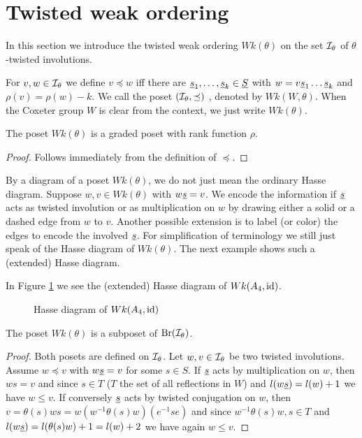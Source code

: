 \section{Twisted weak ordering}
\label{sec:twisted-involutions-twisted-weak-ordering}

In this section we introduce the twisted weak ordering $Wk(\theta)$ on the set $\mathcal{I}_{\theta}$ of $\theta$-twisted involutions.

\begin{defi}
	For $v,w \in \mathcal{I}_{\theta}$ we define $v \preceq w$ iff there are $\underline{s}_1, \ldots, \underline{s}_k \in \underline{S}$ with $w = v \underline{s}_1 \ldots \underline{s}_k$ and $\rho(v) = \rho(w) - k$. We call the poset $(\mathcal{I}_{\theta},\preceq)$ , denoted by $Wk(W, \theta)$. When the Coxeter group $W$ is clear from the context, we just write $Wk(\theta)$.
\end{defi}

\begin{lemm}
	The poset $Wk(\theta)$ is a graded poset with rank function $\rho$.

	\begin{proof}
		Follows immediately from the definition of $\preceq$.
	\end{proof}
\end{lemm}

By a diagram of a poset $Wk(\theta)$, we do not just mean the ordinary Hasse diagram. Suppose $w,v \in Wk(\theta)$ with $w \underline{s} = v$. We encode the information if $\underline{s}$ acts as twisted involution or as multiplication on $w$ by drawing either a solid or a dashed edge from $w$ to $v$. Another possible extension is to label (or color) the edges to encode the involved $\underline{s}$. For simplification of terminology we still just speak of the Hasse diagram of $Wk(\theta)$. The next example shows such a (extended) Hasse diagram.

\begin{exam}
	In Figure \ref{fig:a4} we see the (extended) Hasse diagram of $Wk(A_4, \operatorname{id})$.

	\begin{figure}[ht]
		\centering
		
		\caption{Hasse diagram of $Wk(A_4, \operatorname{id})$}
		\label{fig:a4}
	\end{figure}
\end{exam}

\begin{lemm}
	The poset $Wk(\theta)$ is a subposet of $\operatorname{Br}(\mathcal{I}_{\theta})$.

	\begin{proof}
		Both posets are defined on $\mathcal{I}_{\theta}$. Let $w,v \in \mathcal{I}_{\theta}$ be two twisted involutions. Assume $w \preceq v$ with $w \underline{s} = v$ for some $s \in S$. If $\underline{s}$ acts by multiplication on $w$, then $ws = v$ and since $s \in T$ ($T$ the set of all reflections in $W$) and $l(w \underline{s}) = l(w) + 1$ we have $w \leq v$. If conversely $\underline{s}$ acts by twisted conjugation on $w$, then $v = \theta(s)ws = w (w^{-1} \theta(s) w)(e^{-1}se)$ and since $w^{-1} \theta(s) w, s \in T$ and $l(w \underline{s}) = l(\theta(s)w) + 1 = l(w) + 2$ we have again $w \leq v$.
	\end{proof}
\end{lemm}

